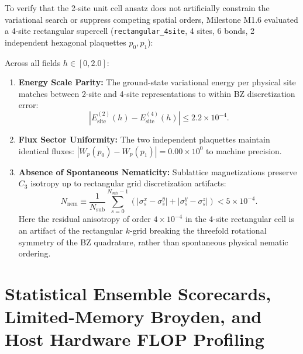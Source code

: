 To verify that the 2-site unit cell ansatz does not artificially constrain the variational search or suppress competing spatial orders, Milestone M1.6 evaluated a 4-site rectangular supercell (\texttt{rectangular\_4site}, 4 sites, 6 bonds, 2 independent hexagonal plaquettes $p_0, p_1$):

\begin{proposition}
\label{prop:m1_6_supercell_parity}
Across all fields $h \in [0, 2.0]$:
\begin{enumerate}
\item \textbf{Energy Scale Parity:} The ground-state variational energy per physical site matches between 2-site and 4-site representations to within BZ discretization error:
\begin{equation}
\label{eq:m1_6_energy_parity}
|E_{\mathrm{site}}^{(2)}(h) - E_{\mathrm{site}}^{(4)}(h)| \le 2.2 \times 10^{-4}.
\end{equation}
\item \textbf{Flux Sector Uniformity:} The two independent plaquettes maintain identical fluxes: $|W_p(p_0) - W_p(p_1)| = 0.00 \times 10^0$ to machine precision.
\item \textbf{Absence of Spontaneous Nematicity:} Sublattice magnetizations preserve $C_3$ isotropy up to rectangular grid discretization artifacts:
\begin{equation}
\label{eq:m1_6_nematicity_bound}
N_{\mathrm{nem}} \equiv \frac{1}{N_{\mathrm{sub}}} \sum_{s=0}^{N_{\mathrm{sub}}-1} \left( |\sigma_s^x - \sigma_s^y| + |\sigma_s^y - \sigma_s^z| \right) < 5 \times 10^{-4}.
\end{equation}
Here the residual anisotropy of order $4 \times 10^{-4}$ in the 4-site rectangular cell is an artifact of the rectangular $k$-grid breaking the threefold rotational symmetry of the BZ quadrature, rather than spontaneous physical nematic ordering.
\end{enumerate}
\end{proposition}




\section{Statistical Ensemble Scorecards, Limited-Memory Broyden, and Host Hardware FLOP Profiling}
\label{sec:m1_6_statistical_scorecards}

